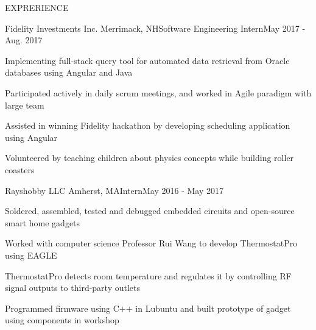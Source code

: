 \documentclass{resume} %
\begin{document}
	\begin{rSection}{EXPRERIENCE}
			
		\begin{rSubsection}{Fidelity Investments Inc.} {Merrimack, NH}{Software Engineering Intern}{May 2017 - Aug. 2017}
			\item Implementing full-stack query tool for automated data retrieval from Oracle databases using Angular and Java 
			\item Participated actively in daily scrum meetings, and worked in Agile paradigm with large team
			\item Assisted in winning Fidelity hackathon by developing scheduling application using Angular
			\item Volunteered by teaching children about physics concepts while building roller coasters
		\end{rSubsection}
	
		\begin{rSubsection}{Rayshobby LLC} {Amherst, MA}{Intern}{May 2016 - May 2017}
			\item Soldered, assembled, tested and debugged embedded circuits and open-source smart home gadgets
			\item Worked with computer science Professor Rui Wang to develop ThermostatPro using EAGLE
			\item ThermostatPro detects room temperature and regulates it by controlling RF signal outputs to third-party outlets
			\item Programmed firmware using C++ in Lubuntu and built prototype of gadget using components in workshop
		\end{rSubsection}
	
	\end{rSection}
	
	
\end{document}
